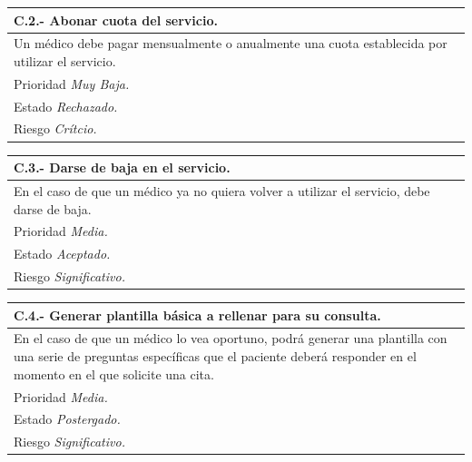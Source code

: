 \documentclass[a4paper,oneside,11pt]{book}
\begin{document}
\begin{center}
\begin{tabulary}{15cm}{|L|}
	\hline
		\bf{C.2.- Abonar cuota del servicio.} \\
	\hline
		Un médico debe pagar mensualmente o anualmente una cuota establecida por utilizar el servicio. \\
	\hline
		Prioridad \textit{Muy Baja.} \\
	\hline
		Estado \textit{Rechazado.} \\
	\hline
		Riesgo \textit{Crítcio.} \\
	\hline
\end{tabulary}
\end{center}

\begin{center}
\begin{tabulary}{15cm}{|L|}
	\hline
		\bf{C.3.- Darse de baja en el servicio.} \\
	\hline
		En el caso de que un médico ya no quiera volver a utilizar el servicio, debe darse de baja. \\
	\hline
		Prioridad \textit{Media.} \\
	\hline
		Estado \textit{Aceptado.} \\
	\hline
		Riesgo \textit{Significativo.} \\
	\hline
\end{tabulary}
\end{center}

\begin{center}
\begin{tabulary}{15cm}{|L|}
	\hline
		\bf{C.4.- Generar plantilla básica a rellenar para su consulta.} \\
	\hline
		En el caso de que un médico lo vea oportuno, podrá generar una plantilla con una serie de preguntas específicas que el paciente deberá responder en el momento en el que solicite una cita. \\
	\hline
		Prioridad \textit{Media.} \\
	\hline
		Estado \textit{Postergado.} \\
	\hline
		Riesgo \textit{Significativo.} \\
	\hline
\end{tabulary}
\end{center}
\end{document}
